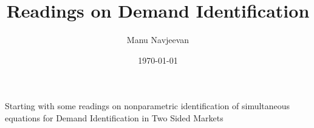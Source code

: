 \documentclass[10pt]{article}
\title{Readings on Demand Identification}
\author{Manu Navjeevan}
\date{\today}
\theoremstyle{exampstyle}
\begin{document}
\maketitle
\tableofcontents
\newpage

Starting with some readings on nonparametric identification of simultaneous equations for Demand Identification in Two Sided Markets 


\newpage

\newpage

\end{document}
